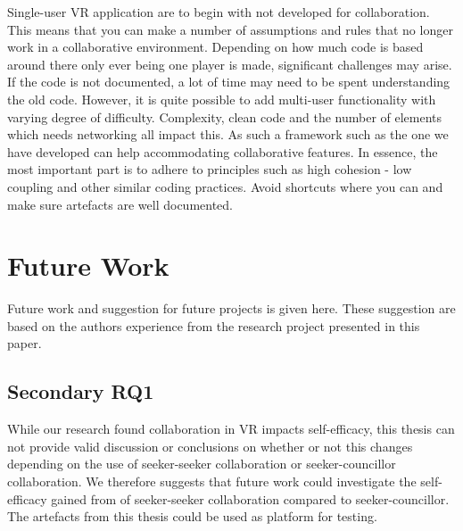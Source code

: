 Single-user VR application are to begin with not developed for collaboration. This means that you can make a number of assumptions and rules that no longer work in a collaborative environment. Depending on how much code is based around there only ever being one player is made, significant challenges may arise. If the code is not documented, a lot of time may need to be spent understanding the old code. However, it is quite possible to add multi-user functionality with varying degree of difficulty. Complexity, clean code and the number of elements which needs networking all impact this. As such a framework such as the one we have developed can help accommodating collaborative features. In essence, the most important part is to adhere to principles such as high cohesion - low coupling and other similar coding practices. Avoid shortcuts where you can and make sure artefacts are well documented.







    
    
        


    

\section{Future Work}
Future work and suggestion for future projects is given here. These suggestion are based on the authors experience from the research project presented in this paper. 

\label{section:futureWork}

\subsection{Secondary RQ1}
While our research found collaboration in VR impacts self-efficacy, this thesis can not provide valid discussion or conclusions on whether or not this changes depending on the use of seeker-seeker collaboration or seeker-councillor collaboration. We therefore suggests that future work could investigate the self-efficacy gained from of seeker-seeker collaboration compared to seeker-councillor. The artefacts from this thesis could be used as platform for testing.  

